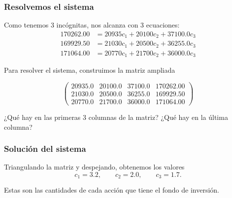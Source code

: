 \documentclass[aspectratio=169,12pt]{beamer}
\begin{document}

\begin{frame}
\frametitle{Resolvemos el sistema}

Como tenemos 3 incógnitas, nos alcanza con 3 ecuaciones:
\begin{align*}
170262.00	&= 20935	c_1 + 20100 c_2 + 37100.0 c_3 \\
169929.50	&= 21030	c_1 + 20500 c_2 + 36255.0 c_3 \\
171064.00	&= 20770	c_1 + 21700 c_2 + 36000.0 c_3
\end{align*}

Para resolver el sistema, construimos la matriz ampliada

$$
\left(\begin{array}{ccc|c}
20935.0	& 20100.0 & 37100.0 & 170262.00	 \\
21030.0	& 20500.0 & 36255.0 & 169929.50	 \\
20770.0	& 21700.0 & 36000.0 & 171064.00	
\end{array}\right)
$$

\vspace{0.5cm}

¿Qué hay en las primeras 3 columnas de la matriz? ¿Qué hay en la última columna?

\end{frame}


\begin{frame}
\frametitle{Solución del sistema}

Triangulando la matriz y despejando, obtenemos los valores
$$
c_1 = 3.2, \quad \quad c_2 =  2.0, \quad \quad c_3 = 1.7.
$$

Estas son las cantidades de cada acción que tiene el fondo de inversión.

\end{frame}

\end{document}
